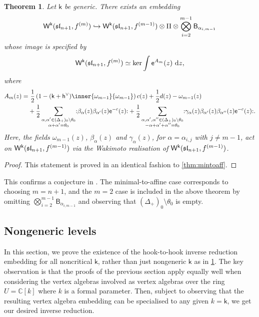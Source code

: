 \documentclass[10pt,a4paper]{amsart}
\numberwithin{equation}{section}
\renewcommand{\cong}{\simeq} %
\newcommand{\dd}{\mathrm{d}}   %
\newcommand{\ee}{\mathsf{e}}   %
\newcommand{\kk}{\mathsf{k}}   %
\DeclarePairedDelimiter{\brac}{\lparen}{\rparen}   %
\newcommand{\no}[1]{\mathopen{:} #1 \mathclose{:}} %
\newcommand{\fld}[1]{\mathbb{#1}}    %
\newcommand{\alg}[1]{\mathfrak{#1}}  %
\newcommand{\VOA}[1]{\mathsf{#1}}    %
\newcommand{\CC}{\fld{C}}
\newcommand{\SLA}[2]{\alg{#1}_{#2}}                      %
\newcommand{\slnpone}{\SLA{sl}{n+1}}
\newcommand{\cox}{\mathsf{h}}                                        %
\newcommand{\dcox}{\coroot{\cox}}                                    %
\newcommand{\proots}{\Delta_+}                                       %
\newcommand{\sroot}[1]{\alpha_{#1}}                                  %
\newcommand{\hroot}{\theta}                                          %
\newcommand{\fwt}[1]{\omega_{#1}}                                    %
\newcommand{\coroot}[1]{#1^{\vee}}                                   %
\newcommand{\fhook}[1]{f^{(#1)}}                                  %
\newcommand{\Wsymb}{\VOA{W}}
\newcommand{\bgvoa}{\VOA{B}}                                      %
\newcommand{\uQHR}[3]{\Wsymb^{#1}\brac{#2,#3}}                    %
\theoremstyle{plain}
\newtheorem{theorem}{Theorem}[section]
\begin{document}
\begin{theorem} \label{thm:HookToHook}
Let $\kk$ be generic. There exists an embedding 
%
\begin{equation}
    \uQHR{\kk}{\slnpone}{\fhook{m}} \hookrightarrow \uQHR{\kk}{\slnpone}{\fhook{m-1}} \otimes \Pi \otimes \bigotimes_{i=2}^{m-1} \bgvoa_{\sroot{i,m-1}}
\end{equation}
%
whose image is specified by
%
\begin{equation}
   \uQHR{\kk}{\slnpone}{\fhook{m}} \cong \textup{\normalfont ker} \int  \ee^{A_m}(z) \ \dd z,
\end{equation}
%
where
%
\begin{align}
     A_m(z) = &\ \frac{1}{2}\left(1-(\kk+\dcox)\inner{\fwt{m-1}}{\fwt{m-1}} \right) c(z) + \frac{1}{2}d(z)  - \fwt{m-1}(z) \\
    &+ \frac{1}{2} \sum_{\substack{\alpha,\alpha' \in (\proots)_0 \setminus \hroot_0 \\ \alpha+\alpha'=\hroot_0}} \no{\beta_\alpha (z) \beta_{\alpha'}(z)\ee^{-c}(z)} 
    +\frac{1}{2} \sum_{\substack{\alpha,\alpha',\alpha'' \in (\proots)_0 \setminus \hroot_0 \\ -\alpha+\alpha'+\alpha''=\hroot_0}} \no{\gamma_\alpha(z) \beta_{\alpha'} (z) \beta_{\alpha''}(z)\ee^{-c}(z)}. \notag
\end{align}
%
Here, the fields $\fwt{m-1}(z)$, $\beta_\alpha(z)$ and $\gamma_\alpha(z)$, for $\alpha =\sroot{i,j}$ with $ j \neq m-1$, act on $\uQHR{\kk}{\slnpone}{\fhook{m-1}}$ via the Wakimoto realisation of $\uQHR{\kk}{\slnpone}{\fhook{m-1}}$.
\end{theorem}
\begin{proof}
This statement is proved in an identical fashion to \cref{thm:mintoaff}.
\end{proof}

\noindent This confirms a conjecture in \cite{FehThesis}. The minimal-to-affine case corresponds to choosing $m=n+1$, and the $m=2$ case is included in the above theorem by omitting $\bigotimes_{i=2}^{m-1} \bgvoa_{\sroot{i,m-1}}$ and observing that $(\proots)_0 \setminus \hroot_0$ is empty.

\subsection{Nongeneric levels} \label{subsec:Nongeneric}

In this section, we prove the existence of the hook-to-hook inverse reduction embedding for all noncritical $\kk$, rather than just nongeneric $\kk$ as in \cref{thm:HookToHook}. The key observation is that the proofs of the previous section apply equally well when considering the vertex algebras involved as vertex algebras over the ring $U = \CC[k]$ where $k$ is a formal parameter. Then, subject to observing that the resulting vertex algebra embedding can be specialised to any given $k=\kk$, we get our desired inverse reduction.
\end{document}
